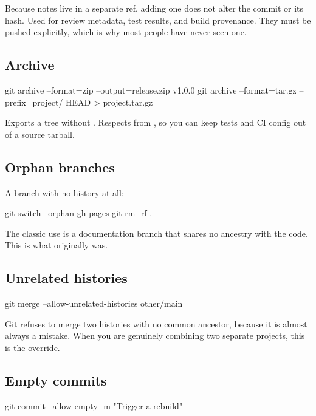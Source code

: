 \documentclass[11pt]{article}
\begin{document}
Because notes live in a separate ref, adding one does not alter the commit or its
hash. Used for review metadata, test results, and build provenance. They must be
pushed explicitly, which is why most people have never seen one.

\subsection{Archive}

\begin{shell}
git archive --format=zip --output=release.zip v1.0.0
git archive --format=tar.gz --prefix=project/ HEAD > project.tar.gz
\end{shell}

Exports a tree without . Respects  from
, so you can keep tests and CI config out of a source tarball.

\subsection{Orphan branches}

A branch with no history at all:

\begin{shell}
git switch --orphan gh-pages
git rm -rf .
\end{shell}

The classic use is a documentation branch that shares no ancestry with the code. This
is what  originally was.

\subsection{Unrelated histories}

\begin{shell}
git merge --allow-unrelated-histories other/main
\end{shell}

Git refuses to merge two histories with no common ancestor, because it is almost
always a mistake. When you are genuinely combining two separate projects, this is
the override.

\subsection{Empty commits}

\begin{shell}
git commit --allow-empty -m "Trigger a rebuild"
\end{shell}
\end{document}
